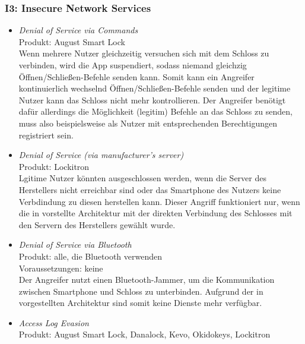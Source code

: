     \subsubsection*{I3: Insecure Network Services}
        \begin{itemize}[leftmargin=0cm,label={}]
            \item \emph{Denial of Service via Commands}\cite{Ye2017}\label{vuln:doscmd}\\
    	        Produkt: August Smart Lock \\ 
                Wenn mehrere Nutzer gleichzeitig versuchen sich mit dem Schloss zu verbinden, wird die App suspendiert, sodass niemand gleichzig Öffnen/\-Schließen-Befehle senden kann. 
    		    Somit kann ein Angreifer kontinuierlich wechselnd Öffnen/Schließen-Befehle senden und der legitime Nutzer kann das Schloss nicht mehr kontrollieren. 
    		    Der Angreifer benötigt dafür allerdings die Möglichkeit (legitim) Befehle an das Schloss zu senden, muss also beispielsweise als Nutzer mit entsprechenden Berechtigungen registriert sein.
		    \item \emph{Denial of Service (via manufacturer's server)}\cite{Ye2017}\label{vuln:dosserver}\\
                Produkt: Lockitron\\
                Lgitime Nutzer könnten ausgeschlossen werden, wenn die Server des Herstellers nicht erreichbar sind oder das Smartphone des Nutzers keine Verbdindung zu diesen herstellen kann.
                Dieser Angriff funktioniert nur, wenn die in  vorstellte Architektur mit der direkten Verbindung des Schlosses mit den Servern des Herstellers gewählt wurde.
            \item \emph{Denial of Service via Bluetooth}\cite{Ye2017}\label{vuln:dosble}\\
    	        Produkt: alle, die Bluetooth verwenden\\ 
                Voraussetzungen: keine\\
                Der Angreifer nutzt einen Bluetooth-Jammer, um die Kommunikation zwischen Smartphone und Schloss zu unterbinden. 
                Aufgrund der in  vorgestellten Architektur sind somit keine Dienste mehr verfügbar. 
            \item \emph{Access Log Evasion}\cite{Ho2016}\label{vuln:accesslogevasion}\\
                Produkt: August Smart Lock, Danalock, Kevo, Okidokeys, Lockitron\\

\end{itemize}
